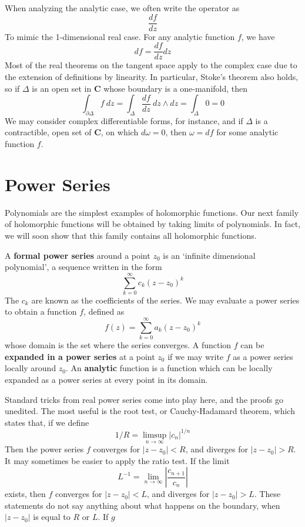 When analyzing the analytic case, we often write the operator as
%
\[ \frac{df}{dz} \]
%
To mimic the 1-dimensional real case. For any analytic function $f$, we have
%
\[ df = \frac{df}{dz} dz \]
%
Most of the real theorems on the tangent space apply to the complex case due to the extension of definitions by linearity. In particular, Stoke's theorem also holds, so if $\Delta$ is an open set in $\mathbf{C}$ whose boundary is a one-manifold, then
%
\[ \int_{\partial \Delta} f\ dz = \int_\Delta \frac{df}{dz}\ dz \wedge dz = \int_\Delta 0 = 0 \]
%
We may consider complex differentiable forms, for instance, and if $\Delta$ is a contractible, open set of $\mathbf{C}$, on which $d \omega = 0$, then $\omega = df$ for some analytic function $f$.



\section{Power Series}

Polynomials are the simplest examples of holomorphic functions. Our next family of holomorphic functions will be obtained by taking limits of polynomials. In fact, we will soon show that this family contains all holomorphic functions.

\begin{definition}
    A {\bf formal power series} around a point $z_0$ is an `infinite dimensional polynomial', a sequence written in the form
    \[ \sum_{k = 0}^\infty c_k (z - z_0)^k \]
    The $c_k$ are known as the coefficients of the series. We may evaluate a power series to obtain a function $f$, defined as
    \[ f(z) = \sum_{k = 0}^\infty a_k (z - z_0)^k \]
    whose domain is the set where the series converges. A function $f$ can be {\bf expanded in a power series} at a point $z_0$ if we may write $f$ as a power series locally around $z_0$. An {\bf analytic} function is a function which can be locally expanded as a power series at every point in its domain.
\end{definition}

Standard tricks from real power series come into play here, and the proofs go unedited. The most useful is the root test, or Cauchy-Hadamard theorem, which states that, if we define
%
\[ 1/R = \limsup_{n \to \infty} |c_n|^{1/n} \]
%
Then the power series $f$ converges for $|z - z_0| < R$, and diverges for $|z - z_0| > R$. It may sometimes be easier to apply the ratio test. If the limit
%
\[ L^{-1} = \lim_{n \to \infty} \left| \frac{c_{n+1}}{c_n} \right| \]
%
exists, then $f$ converges for $|z - z_0| < L$, and diverges for $|z - z_0| > L$. These statements do not say anything about what happens on the boundary, when $|z - z_0|$ is equal to $R$ or $L$. If $g$ 

